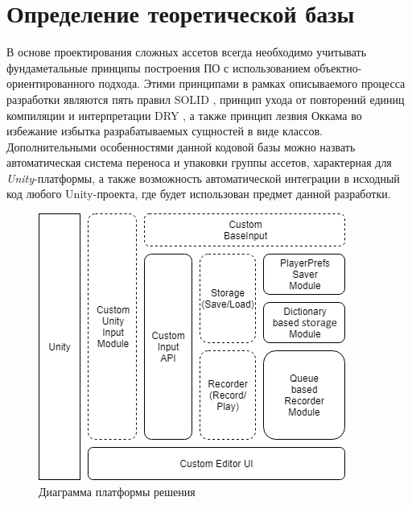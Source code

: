 \section{Определение теоретической базы}
В основе проектирования сложных ассетов всегда необходимо учитывать фундаметальные принципы построения ПО с использованием объектно-ориентированного подхода. Этими принципами в рамках описываемого процесса разработки являются пять правил SOLID \cite{solid}, принцип ухода от повторений единиц компиляции и интерпретации DRY \cite{dry}, а также принцип лезвия Оккама во избежание избытка разрабатываемых сущностей в виде классов. Дополнительными особенностями данной кодовой базы можно назвать автоматическая система переноса и упаковки группы ассетов, характерная для \textit{Unity}-платформы, а также возможность автоматической интеграции в исходный код любого Unity-проекта, где будет использован предмет данной разработки.

\begin{figure}[H]
	\centering
	\includegraphics[width=0.7\linewidth]{platform.png}
	\caption{Диаграмма платформы решения}
	\label{platform}
\end{figure}

